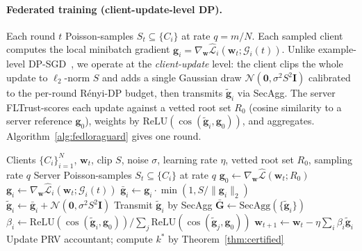 \documentclass[11pt]{article}
\theoremstyle{plain}
\theoremstyle{definition}
\theoremstyle{remark}
\newcommand{\modelname}{FedLoRAGuard}
\newcommand{\Lcal}{\mathcal{L}}
\newcommand{\Gcal}{\mathcal{G}}
\newcommand{\Ncal}{\mathcal{N}}
\newcommand{\norm}[1]{\|#1\|}
\begin{document}
\paragraph{Federated training (client-update-level DP).}
Each round $t$ Poisson-samples $S_t\!\subseteq\!\{C_i\}$ at rate
$q\!=\!m/N$. Each sampled client computes the local minibatch
gradient
$\mathbf{g}_i\!=\!\nabla_{\mathbf{w}}\hat{\Lcal}_i(\mathbf{w}_t;
\Gcal_i(t))$. Unlike example-level
DP-SGD~\cite{abadi2016deep}, we operate at the
\emph{client-update} level: the client clips the whole update to
$\ell_2$-norm $S$ and adds a single Gaussian draw
$\Ncal(\mathbf{0},\sigma^2 S^2\mathbf{I})$ calibrated to the
per-round R\'enyi-DP budget, then transmits
$\tilde{\mathbf{g}}_i$ via SecAgg. The server FLTrust-scores
each update against a vetted root set $R_0$ (cosine similarity
to a server reference $\mathbf{g}_0$), weights by
$\mathrm{ReLU}(\cos(\tilde{\mathbf{g}}_i,\mathbf{g}_0))$, and
aggregates. Algorithm~\ref{alg:fedloraguard} gives one round.

\begin{algorithm}[t]
\small
\caption{\modelname\ training round}
\label{alg:fedloraguard}
\begin{algorithmic}[1]
\REQUIRE Clients $\{C_i\}_{i=1}^N$, $\mathbf{w}_t$, clip $S$, noise $\sigma$, learning rate $\eta$, vetted root set $R_0$, sampling rate $q$
\STATE Server Poisson-samples $S_t \subseteq \{C_i\}$ at rate $q$
\STATE $\mathbf{g}_0 \gets \nabla_{\mathbf{w}} \hat{\Lcal}(\mathbf{w}_t; R_0)$
    \STATE $\mathbf{g}_i \gets \nabla_{\mathbf{w}} \hat{\Lcal}_i(\mathbf{w}_t; \Gcal_i(t))$  \hfill{}
    \STATE $\bar{\mathbf{g}}_i \gets \mathbf{g}_i \cdot \min(1, S/\norm{\mathbf{g}_i}_2)$  \hfill{}
    \STATE $\tilde{\mathbf{g}}_i \gets \bar{\mathbf{g}}_i + \Ncal(\mathbf{0}, \sigma^2 S^2 \mathbf{I})$
    \STATE Transmit $\tilde{\mathbf{g}}_i$ by SecAgg
\ENDFOR
\STATE $\bar{\mathbf{G}} \gets \mathrm{SecAgg}(\{\tilde{\mathbf{g}}_i\})$
\STATE $\beta_i \gets \mathrm{ReLU}(\cos(\tilde{\mathbf{g}}_i, \mathbf{g}_0)) / \sum_j \mathrm{ReLU}(\cos(\tilde{\mathbf{g}}_j, \mathbf{g}_0))$
\STATE $\mathbf{w}_{t+1} \gets \mathbf{w}_t - \eta \sum_i \beta_i \tilde{\mathbf{g}}_i$
\STATE Update PRV accountant; compute $k^*$ by Theorem~\ref{thm:certified}
\end{algorithmic}
\end{algorithm}

\end{document}
